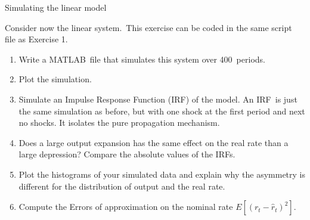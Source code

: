 \documentclass[a4paper,12pt]{article}%
\begin{document}
\begin{myexercise}{Simulating the linear model}
%


Consider now the linear system.\ This exercise can be coded in the same script
file as Exercise 1.

\begin{enumerate}
\item Write a MATLAB\ file that simulates this system over 400\ periods.\ 

\item Plot the simulation.

\item Simulate an Impulse Response Function (IRF) of the model. An IRF\ is
just the same simulation as before, but with one shock at the first period and
next no shocks. It isolates the pure propagation mechanism.

\item Does a large output expansion has the same effect on the real rate than
a large depression? Compare the absolute values of the IRFs.

\item Plot the histograms of your simulated data and explain why the asymmetry
is different for the distribution of output and the real rate.

\item Compute the Errors of approximation on the nominal rate $E\left[
\left(  r_{t}-\hat{r}_{t}\right)  ^{2}\right]  $.
\end{enumerate}

%

\end{myexercise}%


\newpage%

\footnotesize

%
\normalsize
\end{document}
